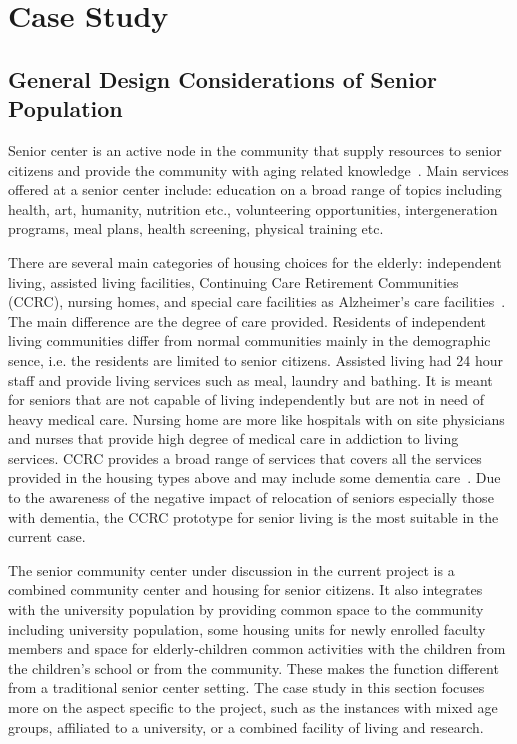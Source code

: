 
\chapter{Case Study} %

\label{Chapter2} %



\section{General Design Considerations of Senior Population}
Senior center is an active node in the community that supply resources
to senior citizens and provide the community with aging related
knowledge~\cite{Dalsanto2009}. Main services offered at a senior
center include: education on a broad range of topics including health,
art, humanity, nutrition etc., volunteering opportunities,
intergeneration programs, meal plans, health screening, physical
training etc. 

There are several main categories of housing choices for the elderly:
independent living, assisted living facilities, Continuing Care
Retirement Communities (CCRC), nursing homes, and special care
facilities as Alzheimer's care facilities~\cite{JFCS2015}. The main
difference are the degree of care provided. Residents of independent
living communities differ from normal communities mainly in the
demographic sence, i.e. the residents are limited to senior
citizens. Assisted living had 24 hour staff and provide living
services such as meal, laundry and bathing. It is meant for seniors
that are not capable of living independently but are not in need of
heavy medical care. Nursing home are more like hospitals with on site
physicians and nurses that provide high degree of medical care in
addiction to living services. CCRC provides a broad range of services
that covers all the services provided in the housing types above and
may include some dementia care~\cite{JFCS2015}. Due to the awareness
of the negative impact of relocation of seniors especially those with
dementia, the CCRC prototype for senior living is the most suitable in
the current case.

The senior community center under discussion in the current project is
a combined community center and housing for senior citizens. It also
integrates with the university population by providing common space to
the community including university population, some housing units for
newly enrolled faculty members and space for elderly-children common
activities with the children from the children's school or from the
community. These makes the function different from a traditional
senior center setting. The case study in this section focuses more on
the aspect specific to the project, such as the instances with mixed
age groups, affiliated to a university, or a combined facility of
living and research.
 
